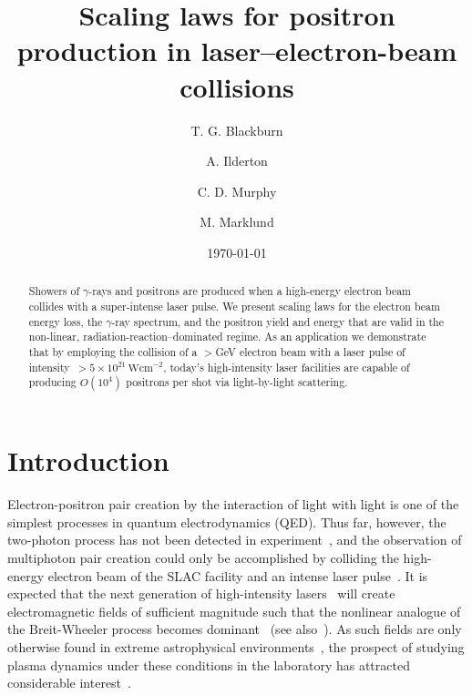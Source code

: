 \documentclass[reprint,superscriptaddress,amsmath,amssymb,aps,pra]{revtex4-1}
\newcommand{\Wcm}{\mathrm{Wcm}}
\begin{document}
\title{Scaling laws for positron production in laser--electron-beam collisions}

\author{T. G. Blackburn}
\author{A. Ilderton}
\author{C. D. Murphy}
\author{M. Marklund}

\date{\today}

\begin{abstract}
Showers of $\gamma$-rays and positrons are produced when a high-energy electron
beam collides with a super-intense laser pulse. We present scaling laws for the
electron beam energy loss, the $\gamma$-ray spectrum, and the positron yield
and energy that are valid in the non-linear, radiation-reaction--dominated regime.
As an application we demonstrate that by employing the collision of a $>$GeV
electron beam with a laser pulse of intensity~$>5\times10^{21}\,\Wcm^{-2}$,
today's high-intensity laser facilities are capable of producing $O(10^4)$
positrons per shot via light-by-light scattering.
\end{abstract}

\maketitle

\section{Introduction}

Electron-positron pair creation by the interaction of light with light
is one of the simplest processes in quantum electrodynamics (QED).
Thus far, however, the two-photon process has not been detected in
experiment~\cite{BreitWheeler,Pike,Ribeyre}, and the observation of
multiphoton pair creation could only be accomplished by colliding
the high-energy electron beam of the SLAC facility and an intense
laser pulse~\cite{Bula,Burke,Bamber}. It is expected that the next
generation of high-intensity lasers~\cite{ELI,Vulcan,XCELS,Apollon}
will create electromagnetic fields of sufficient magnitude such
that the nonlinear analogue of the Breit-Wheeler process becomes
dominant~\cite{Hu} (see also~\cite{Ilderton:2010wr,King:2013osa}).
As such fields are only otherwise found in extreme astrophysical
environments~\cite{Goldreich,Piran,Ruffini,Harding}, the prospect
of studying plasma dynamics under these conditions in the laboratory
has attracted considerable interest~\cite{MourouRMP,MarklundRMP,DiPiazzaRMP}.
\end{document}
